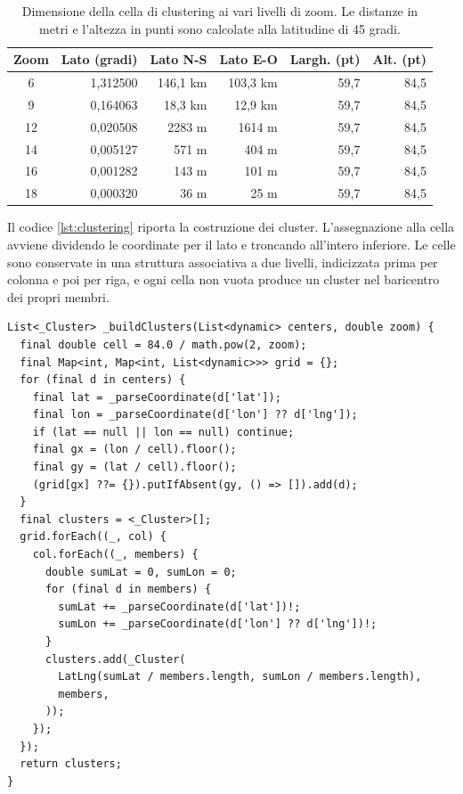 \begin{table}[H]
\centering
\footnotesize
\begin{tabular}{@{}c r r r r r@{}}
\toprule
\textbf{Zoom} & \textbf{Lato (gradi)} & \textbf{Lato N-S} & \textbf{Lato E-O} & \textbf{Largh. (pt)} & \textbf{Alt. (pt)} \tabularnewline
\midrule
6  & 1,312500  & 146,1 km & 103,3 km & 59,7 & 84,5 \tabularnewline
9  & 0,164063  & 18,3 km  & 12,9 km  & 59,7 & 84,5 \tabularnewline
12 & 0,020508  & 2283 m   & 1614 m   & 59,7 & 84,5 \tabularnewline
14 & 0,005127  & 571 m    & 404 m    & 59,7 & 84,5 \tabularnewline
16 & 0,001282  & 143 m    & 101 m    & 59,7 & 84,5 \tabularnewline
18 & 0,000320  & 36 m     & 25 m     & 59,7 & 84,5 \tabularnewline
\bottomrule
\end{tabular}
\caption{Dimensione della cella di clustering ai vari livelli di zoom. Le distanze in metri e l'altezza in punti sono calcolate
alla latitudine di 45 gradi.}
\label{tab:celle}
\end{table}


Il codice \ref{lst:clustering} riporta la costruzione dei cluster.
L'assegnazione alla cella avviene dividendo le coordinate per il lato e troncando all'intero inferiore.
Le celle sono conservate in una struttura associativa a due livelli, indicizzata prima per colonna e poi per riga, e
ogni cella non vuota produce un cluster nel baricentro dei propri membri.

\begin{listing}[H]
\begin{verbatim}
List<_Cluster> _buildClusters(List<dynamic> centers, double zoom) {
  final double cell = 84.0 / math.pow(2, zoom);
  final Map<int, Map<int, List<dynamic>>> grid = {};
  for (final d in centers) {
    final lat = _parseCoordinate(d['lat']);
    final lon = _parseCoordinate(d['lon'] ?? d['lng']);
    if (lat == null || lon == null) continue;
    final gx = (lon / cell).floor();
    final gy = (lat / cell).floor();
    (grid[gx] ??= {}).putIfAbsent(gy, () => []).add(d);
  }
  final clusters = <_Cluster>[];
  grid.forEach((_, col) {
    col.forEach((_, members) {
      double sumLat = 0, sumLon = 0;
      for (final d in members) {
        sumLat += _parseCoordinate(d['lat'])!;
        sumLon += _parseCoordinate(d['lon'] ?? d['lng'])!;
      }
      clusters.add(_Cluster(
        LatLng(sumLat / members.length, sumLon / members.length),
        members,
      ));
    });
  });
  return clusters;
}
\end{verbatim}
\caption{Costruzione dei cluster a griglia dipendente dallo zoom.}
\label{lst:clustering}
\end{listing}

